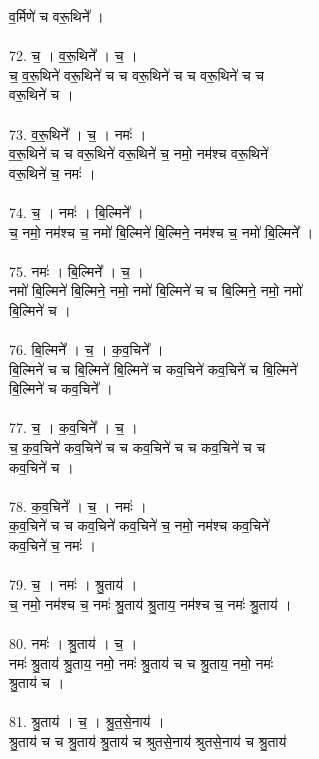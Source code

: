 व॒र्मिणे॑ च वरू॒थिने᳚ ।\\
\\
72. च॒ । व॒रू॒थिने᳚ । च॒ ।\\
च॒ व॒रू॒थिने॑ वरू॒थिने॑ च च वरू॒थिने॑ च च वरू॒थिने॑ च च\\
वरू॒थिने॑ च ।\\
\\
73. व॒रू॒थिने᳚ । च॒ । नमः॑ ।\\
व॒रू॒थिने॑ च च वरू॒थिने॑ वरू॒थिने॑ च॒ नमो॒ नम॑श्च वरू॒थिने॑\\
वरू॒थिने॑ च॒ नमः॑ ।\\
\\
74. च॒ । नमः॑ । बि॒ल्मिने᳚ ।\\
च॒ नमो॒ नम॑श्च च॒ नमो॑ बि॒ल्मिने॑ बि॒ल्मिने॒ नम॑श्च च॒ नमो॑ बि॒ल्मिने᳚ ।\\
\\
75. नमः॑ । बि॒ल्मिने᳚ । च॒ ।\\
नमो॑ बि॒ल्मिने॑ बि॒ल्मिने॒ नमो॒ नमो॑ बि॒ल्मिने॑ च च बि॒ल्मिने॒ नमो॒ नमो॑\\
बि॒ल्मिने॑ च ।\\
\\
76. बि॒ल्मिने᳚ । च॒ । क॒व॒चिने᳚ ।\\
बि॒ल्मिने॑ च च बि॒ल्मिने॑ बि॒ल्मिने॑ च कव॒चिने॑ कव॒चिने॑ च बि॒ल्मिने॑\\
बि॒ल्मिने॑ च कव॒चिने᳚ ।\\
\\
77. च॒ । क॒व॒चिने᳚ । च॒ ।\\
च॒ क॒व॒चिने॑ कव॒चिने॑ च च कव॒चिने॑ च च कव॒चिने॑ च च\\
कव॒चिने॑ च ।\\
\\
78. क॒व॒चिने᳚ । च॒ । नमः॑ ।\\
क॒व॒चिने॑ च च कव॒चिने॑ कव॒चिने॑ च॒ नमो॒ नम॑श्च कव॒चिने॑\\
कव॒चिने॑ च॒ नमः॑ ।\\
\\
79. च॒ । नमः॑ । श्रु॒ताय॑ ।\\
च॒ नमो॒ नम॑श्च च॒ नमः॑ श्रु॒ताय॑ श्रु॒ताय॒ नम॑श्च च॒ नमः॑ श्रु॒ताय॑ ।\\
\\
80. नमः॑ । श्रु॒ताय॑ । च॒ ।\\
नमः॑ श्रु॒ताय॑ श्रु॒ताय॒ नमो॒ नमः॑ श्रु॒ताय॑ च च श्रु॒ताय॒ नमो॒ नमः॑\\
श्रु॒ताय॑ च ।\\
\\
81. श्रु॒ताय॑ । च॒ । श्रु॒त॒से॒नाय॑ ।\\
श्रु॒ताय॑ च च श्रु॒ताय॑ श्रु॒ताय॑ च श्रुतसे॒नाय॑ श्रुतसे॒नाय॑ च श्रु॒ताय॑\\
